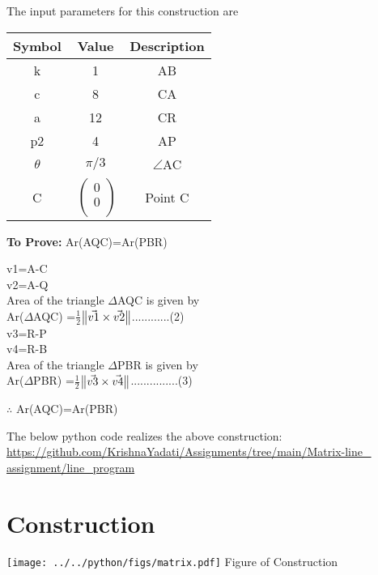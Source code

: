\documentclass[10pt, a4paper]{article}
\begin{document}
The input parameters for this construction are 
\begin{center}
\begin{tabular}{|c|c|c|}
	\hline
	\textbf{Symbol}&\textbf{Value}&\textbf{Description}\\
	\hline
	k&1&AB\\
	\hline
	c&8&CA\\
	\hline
	a&12&CR\\
	\hline
	p2&4&AP\\
	\hline
	${\theta}$& $\pi/3$&$ \angle $AC\\  
	\hline
	C&$\
	\begin{pmatrix}
		0 \\
		0 \\
	\end{pmatrix}$%
	&Point C\\
	
	\hline
\end{tabular}
\end{center}
\textbf{To Prove:} Ar(AQC)=Ar(PBR)
		\begin{center}
	v1=A-C\\
	v2=A-Q\\
	\vspace{3mm}
	Area of the triangle $\Delta$AQC is given by \\
Ar($\Delta$AQC) =$\frac{1}{2}$$\norm{\vec{v1}\times\vec{v2}}$............(2)\\
\vspace{3mm}
v3=R-P\\
	v4=R-B\\
	\vspace{3mm}
		Area of the triangle $\Delta$PBR is given by \\
 Ar($\Delta$PBR) =$\frac{1}{2}$$\norm{\vec{v3}\times\vec{v4}}$...............(3)
	\end{center}
	\begin{center}
$\therefore$ Ar(AQC)=Ar(PBR)\\

\end{center}
\vspace{10mm}
The below python code realizes the above construction:	\\

\url{https://github.com/KrishnaYadati/Assignments/tree/main/Matrix-line_ assignment/line_program}
 \section{Construction}
 	\begin{center}
    \texttt{[image: ../../python/figs/matrix.pdf]} 
     Figure of Construction
  	\end{center}
  	  

\end{document}

